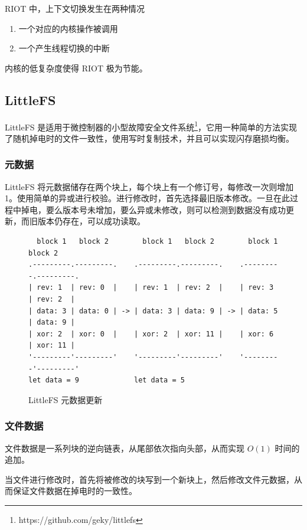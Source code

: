 \documentclass{ctexart}
\begin{document}
RIOT 中，上下文切换发生在两种情况
\begin{enumerate}
	\item 一个对应的内核操作被调用
	\item 一个产生线程切换的中断
\end{enumerate}
内核的低复杂度使得 RIOT 极为节能。

\subsection{LittleFS}

LittleFS 是适用于微控制器的小型故障安全文件系统\footnote{https://github.com/geky/littlefs}，它用一种简单的方法实现了随机掉电时的文件一致性，使用写时复制技术，并且可以实现闪存磨损均衡。

\subsubsection{元数据}

LittleFS 将元数据储存在两个块上，每个块上有一个修订号，每修改一次则增加 1。使用简单的异或进行校验。进行修改时，首先选择最旧版本修改。一旦在此过程中掉电，要么版本号未增加，要么异或未修改，则可以检测到数据没有成功更新，而旧版本仍存在，可以成功读取。

\begin{figure}
\begin{verbatim}
  block 1   block 2        block 1   block 2        block 1   block 2
.---------.---------.    .---------.---------.    .---------.---------.
| rev: 1  | rev: 0  |    | rev: 1  | rev: 2  |    | rev: 3  | rev: 2  |
| data: 3 | data: 0 | -> | data: 3 | data: 9 | -> | data: 5 | data: 9 |
| xor: 2  | xor: 0  |    | xor: 2  | xor: 11 |    | xor: 6  | xor: 11 |
'---------'---------'    '---------'---------'    '---------'---------'
let data = 9             let data = 5
\end{verbatim}
\caption{LittleFS 元数据更新}
\end{figure}

\subsubsection{文件数据}

文件数据是一系列块的逆向链表，从尾部依次指向头部，从而实现 $O(1)$ 时间的追加。

当文件进行修改时，首先将被修改的块写到一个新块上，然后修改文件元数据，从而保证文件数据在掉电时的一致性。
\end{document}
